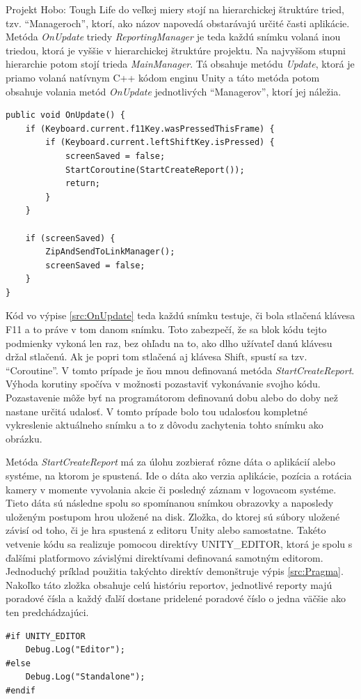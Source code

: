 \documentclass[slovak, bachelorpractice]{diploma}
\begin{document}
Projekt Hobo: Tough Life do veľkej miery stojí na hierarchickej štruktúre tried, tzv. \enquote{Manageroch}, ktorí, ako názov napovedá obstarávajú určité časti aplikácie. Metóda \textit{OnUpdate} triedy \textit{ReportingManager} je teda každú snímku volaná inou triedou, ktorá je vyššie v hierarchickej štruktúre projektu. Na najvyššom stupni hierarchie potom stojí trieda \textit{MainManager}. Tá obsahuje metódu \textit{Update}, ktorá je priamo volaná natívnym C++ kódom enginu Unity a táto metóda potom obsahuje volania metód \textit{OnUpdate} jednotlivých \enquote{Managerov}, ktorí jej náležia.
\vspace{10pt}
\begin{lstlisting}[label=src:OnUpdate,caption={Odchytenie stlačenia klávesovej skratky v spustenej hre}]
public void OnUpdate() {
    if (Keyboard.current.f11Key.wasPressedThisFrame) {
        if (Keyboard.current.leftShiftKey.isPressed) {
            screenSaved = false;
            StartCoroutine(StartCreateReport());
            return;
        }
    }

    if (screenSaved) {
        ZipAndSendToLinkManager();
        screenSaved = false;
    }
}
\end{lstlisting}

Kód vo výpise \ref{src:OnUpdate} teda každú snímku testuje, či bola stlačená klávesa F11 a to práve v tom danom snímku. Toto zabezpečí, že sa blok kódu tejto podmienky vykoná len raz, bez ohľadu na to, ako dlho užívateľ danú klávesu držal stlačenú. Ak je popri tom stlačená aj klávesa Shift, spustí sa tzv. \enquote{Coroutine}. V tomto prípade je ňou mnou definovaná metóda \textit{StartCreateReport}. Výhoda korutiny spočíva v možnosti pozastaviť vykonávanie svojho kódu. Pozastavenie môže byť na programátorom definovanú dobu alebo do doby než nastane určitá udalosť. V tomto prípade bolo tou udalosťou kompletné vykreslenie aktuálneho snímku a to z dôvodu zachytenia tohto snímku ako obrázku.

Metóda \textit{StartCreateReport} má za úlohu zozbierať rôzne dáta o aplikácií alebo systéme, na ktorom je spustená. Ide o dáta ako verzia aplikácie, pozícia a rotácia kamery v momente vyvolania akcie či posledný záznam v logovacom systéme. Tieto dáta sú následne spolu so spomínanou snímkou obrazovky a naposledy uloženým postupom hrou uložené na disk. Zložka, do ktorej sú súbory uložené závisí od toho, či je hra spustená z editoru Unity alebo samostatne. Takéto vetvenie kódu sa realizuje pomocou direktívy UNITY\_EDITOR, ktorá je spolu s ďalšími platformovo závislými direktívami definovaná samotným editorom. Jednoduchý príklad použitia takýchto direktív demonštruje výpis \ref{src:Pragma}. Nakoľko táto zložka obsahuje celú históriu reportov, jednotlivé reporty majú poradové čísla a každý ďalší dostane pridelené poradové číslo o jedna väčšie ako ten predchádzajúci.
\vspace{10pt}
\begin{lstlisting}[label=src:Pragma,caption={Ukážka použitia direktívy UNITY\_EDITOR}]
#if UNITY_EDITOR
	Debug.Log("Editor");                
#else
    Debug.Log("Standalone");             
#endif
\end{lstlisting}
\end{document}
